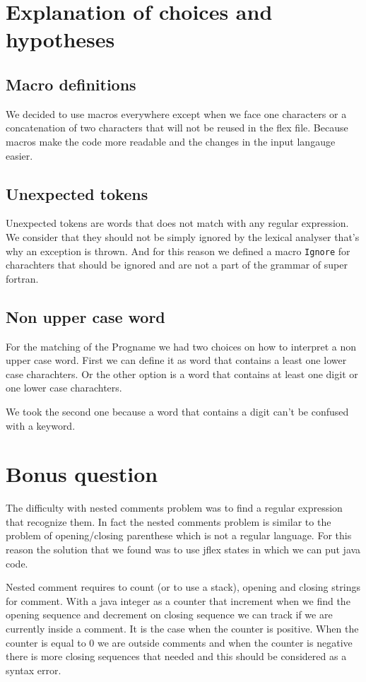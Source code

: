 \documentclass[12pt]{article}
\begin{document}
\section{Explanation of choices and hypotheses}

\subsection{Macro definitions}
We decided to use macros everywhere except when we face one characters or a concatenation of two characters
that will not be reused in the flex file. Because macros make the code more readable and the changes 
in the input langauge easier.

\subsection{Unexpected tokens}
Unexpected tokens are words that does not match with any regular expression. 
We consider that they
should not be simply ignored by the lexical analyser that's why an exception is thrown. 
And for this reason
we defined a macro \texttt{Ignore} for charachters that should be ignored and are not a part of 
the grammar of super fortran.

\subsection{Non upper case word}
For the matching of the Progname we had two choices on how to interpret a non upper case word.
First we can define it as word that contains a least one lower case charachters. Or the other option
is a word that contains at least one digit or one lower case charachters.

We took the second one because a word that contains a digit can't be confused with a keyword.



\section{Bonus question}
The difficulty with nested comments problem was to find a regular expression that recognize them.
In fact the nested comments problem is similar to the problem of opening/closing parenthese which is not a 
regular language. For this reason the solution that we found was to use jflex states in which we can put
java code.


Nested comment requires to count (or to use a stack), opening and closing strings for comment. 
With a java integer as a counter that increment when we find the opening sequence and decrement
on closing sequence we can track if we are
currently inside a comment. It is the case when the counter is positive. When the counter is equal to 0
we are outside comments and when the counter is negative there is more closing sequences that needed and this 
should be considered as a syntax error.
\end{document}
